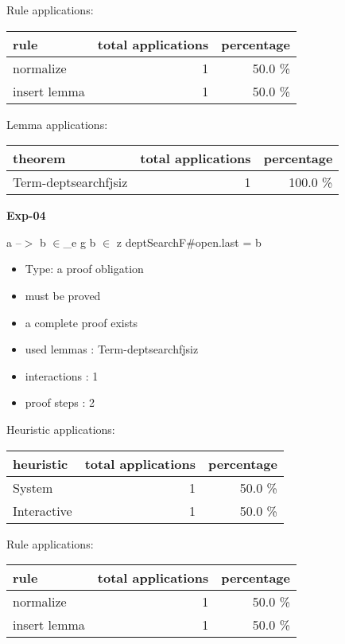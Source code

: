 \documentclass[a4paper]{article}
\begin{document}
Rule applications:

\begin{supertabular}{l|r|r}
rule	        & total applications & percentage \\ \hline
normalize & 1 & 50.0 \% \\
insert lemma & 1 & 50.0 \% \\

\end{supertabular}

Lemma applications:

\begin{supertabular}{l|r|r}
theorem	        & total applications & percentage \\ \hline
Term-deptsearchfjsiz & 1 & 100.0 \% \\

\end{supertabular}
\pagebreak

{\LARGE\bf Exp-04}\label{lemma-Exp-04}

\medskip

 \Fol a --$>$ b $\in$\_e g \And b $\in$ z \Imp \Do deptSearchF\#\Dc open.last = b

\begin{itemize}

\item Type: a proof obligation

\item       must be proved
\item       a complete proof exists
\item       used lemmas  : Term-deptsearchfjsiz
\item       interactions : 1
\item       proof steps  : 2
\end{itemize}

\medskip


Heuristic applications:

\begin{supertabular}{l|r|r}
heuristic	& total applications & percentage \\ \hline
System & 1 & 50.0 \% \\
Interactive & 1 & 50.0 \% \\

\end{supertabular}

Rule applications:

\begin{supertabular}{l|r|r}
rule	        & total applications & percentage \\ \hline
normalize & 1 & 50.0 \% \\
insert lemma & 1 & 50.0 \% \\

\end{supertabular}
\end{document}

